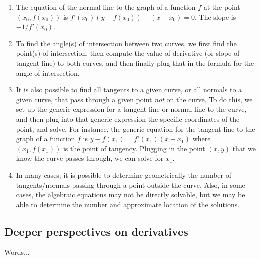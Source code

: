 \documentclass[10pt]{amsart}
\begin{document}
\begin{enumerate}

\item The equation of the normal line to the graph of a
  function $f$ at the point $(x_0,f(x_0))$ is $f'(x_0)(y - f(x_0))
  + (x - x_0) = 0$. The slope is $-1/f'(x_0)$.
\item To find the angle(s) of intersection between two curves, we
  first find the point(s) of intersection, then compute the value of
  derivative (or slope of tangent line) to both curves, and then
  finally plug that in the formula for the angle of intersection.
\item It is also possible to find all tangents to a given curve, or
  all normals to a given curve, that pass through a given point {\em
  not} on the curve. To do this, we set up the generic expression for
  a tangent line or normal line to the curve, and then plug into that
  generic expression the specific coordinates of the point, and
  solve. For instance, the generic equation for the tangent line to
  the graph of a function $f$ is $y - f(x_1) = f'(x_1)(x - x_1)$ where
  $(x_1,f(x_1))$ is the point of tangency. Plugging in the point
  $(x,y)$ that we know the curve passes through, we can solve for
  $x_1$.
\item In many cases, it is possible to determine geometrically the
  number of tangents/normals passing through a point outside the
  curve. Also, in some cases, the algebraic equations may not be
  directly solvable, but we may be able to determine the number and
  approximate location of the solutions.

\end{enumerate}

\subsection{Deeper perspectives on derivatives}

Words... 
\end{document}
